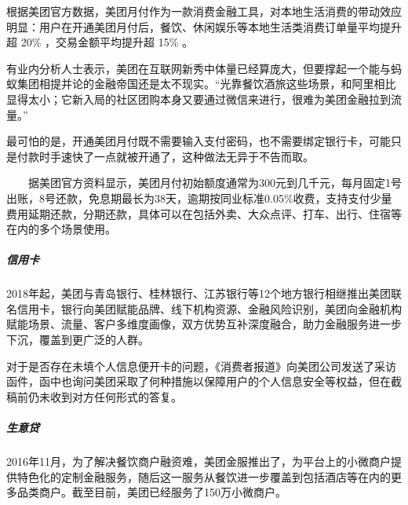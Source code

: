 \documentclass[letterpaper,10pt,english]{sphinxmanual}
\begin{document}
根据美团官方数据，美团月付作为一款消费金融工具，对本地生活消费的带动效应明显：用户在开通美团月付后，餐饮、休闲娱乐等本地生活类消费订单量平均提升超
20\% ，交易金额平均提升超 15\%
。%
\begin{footnote}[1042]\sphinxAtStartFootnote
{}
%
\end{footnote}

有业内分析人士表示，美团在互联网新秀中体量已经算庞大，但要撑起一个能与蚂蚁集团相提并论的金融帝国还是太不现实。“光靠餐饮酒旅这些场景，和阿里相比显得太小；它新入局的社区团购本身又要通过微信来进行，很难为美团金融拉到流量。”%
\begin{footnote}[1043]\sphinxAtStartFootnote
{}
%
\end{footnote}

最可怕的是，开通美团月付既不需要输入支付密码，也不需要绑定银行卡，可能只是付款时手速快了一点就被开通了，这种做法无异于不告而取。

　　据美团官方资料显示，美团月付初始额度通常为300元到几千元，每月固定1号出账，8号还款，免息期最长为38天，逾期按同业标准0.05\%收费，支持支付少量费用延期还款，分期还款，具体可以在包括外卖、大众点评、打车、出行、住宿等在内的多个场景使用。%
\begin{footnote}[1044]\sphinxAtStartFootnote
{}
%
\end{footnote}


\subparagraph{信用卡}
\label{\detokenize{chapter_AI_company/meituan:id14}}
2018年起，美团与青岛银行、桂林银行、江苏银行等12个地方银行相继推出美团联名信用卡，银行向美团赋能品牌、线下机构资源、金融风险识别，美团向金融机构赋能场景、流量、客户多维度画像，双方优势互补深度融合，助力金融服务进一步下沉，覆盖到更广泛的人群。

对于是否存在未填个人信息便开卡的问题，《消费者报道》向美团公司发送了采访函件，函中也询问美团采取了何种措施以保障用户的个人信息安全等权益，但在截稿前仍未收到对方任何形式的答复。%
\begin{footnote}[1045]\sphinxAtStartFootnote
{}
%
\end{footnote}


\subparagraph{生意贷}
\label{\detokenize{chapter_AI_company/meituan:id15}}
2016年11月，为了解决餐饮商户融资难，美团金服推出了，为平台上的小微商户提供特色化的定制金融服务，随后这一服务从餐饮进一步覆盖到包括酒店等在内的更多品类商户。截至目前，美团已经服务了150万小微商户。%
\begin{footnote}[1046]\sphinxAtStartFootnote
{}
%
\end{footnote}
\end{document}
